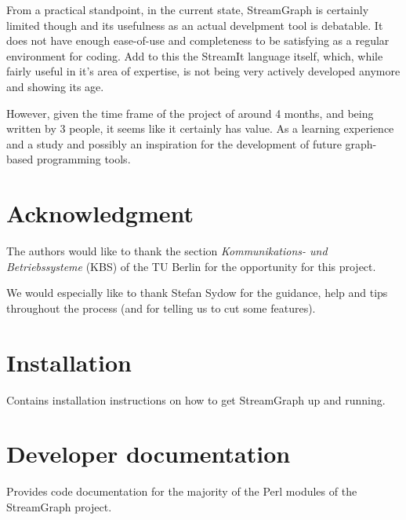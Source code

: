 \documentclass[journal]{IEEEtran}
\begin{document}
From a practical standpoint, in the current state, StreamGraph is certainly
limited though and its usefulness as an actual develpment tool is debatable.
It does not have enough ease-of-use and completeness to be satisfying as a
regular environment for coding. Add to this the StreamIt language itself,
which, while fairly useful in it's area of expertise, is not being very
actively developed anymore and showing its age.

However, given the time frame of the project of around 4 months, and being
written by 3 people, it seems like it certainly has value. As a learning
experience and a study and possibly an inspiration for the development of
future graph-based programming tools.



\section*{Acknowledgment}


\noindent The authors would like to thank the section \emph{Kommunikations- und
Betriebssysteme} (KBS) of the TU Berlin for the opportunity for this project.

\noindent We would especially like to thank Stefan Sydow for the guidance, help and tips
throughout the process (and for telling us to cut some features).



\appendices

\section{Installation}
\noindent Contains installation instructions on how to get StreamGraph up and
running.

\section{Developer documentation}
\noindent Provides code documentation for the majority of the Perl modules of
the StreamGraph project.

\ifCLASSOPTIONcaptionsoff
  \newpage
\fi


\end{document}

